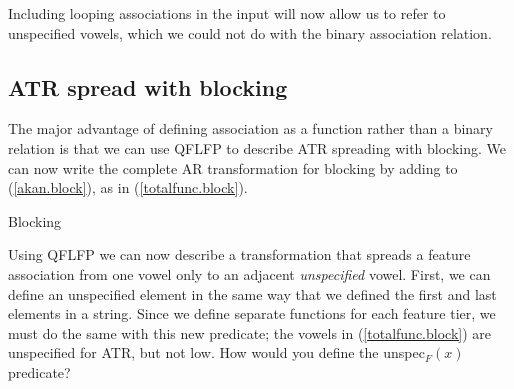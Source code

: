 \documentclass[,doc,floatsintext]{apa6}
\theoremstyle{definition}
\theoremstyle{definition}
\theoremstyle{definition}
\theoremstyle{remark}
\begin{document}
\noindent Including looping associations in the input will now allow us
to refer to unspecified vowels, which we could not do with the binary
association relation.

\subsection{ATR spread with blocking}\label{atr-spread-with-blocking}

The major advantage of defining association as a function rather than a
binary relation is that we can use QFLFP to describe ATR spreading with
blocking. We can now write the complete AR transformation for blocking
by adding to (\ref{akan.block}), as in (\ref{totalfunc.block}).

\begin{exe}
  \ex \label{totalfunc.block} Blocking\\
\end{exe}

\noindent Using QFLFP we can now describe a transformation that spreads
a feature association from one vowel only to an adjacent
\emph{unspecified} vowel. First, we can define an unspecified element in
the same way that we defined the first and last elements in a string.
Since we define separate functions for each feature tier, we must do the
same with this new predicate; the vowels in (\ref{totalfunc.block}) are
unspecified for ATR, but not low. How would you define the
unspec\(_F(x)\) predicate?
\end{document}
